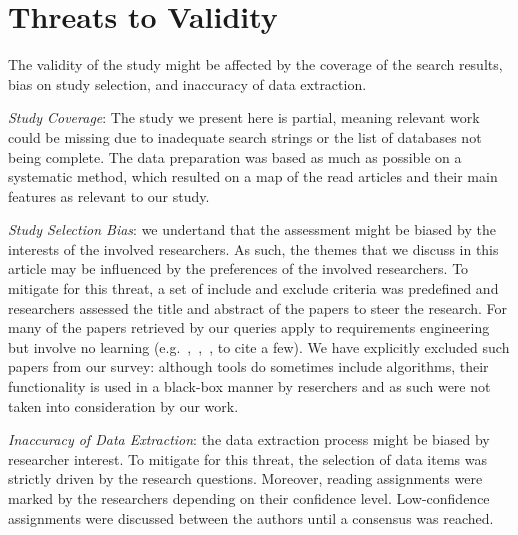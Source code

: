 \section{Threats to Validity}
\label{sec:threats_to_validity}

The validity of the study might be affected by the coverage of the search
results, bias on study selection, and inaccuracy of data extraction.

\emph{Study Coverage}: The study we present here is partial, meaning
relevant work could be missing due to inadequate search strings or
the list of databases not being complete. The data preparation was based as
much as possible on a systematic method, which resulted on a map of the read
articles and their main features as relevant to our study.

\emph{Study Selection Bias}: we undertand that the assessment might be biased by
the interests of the involved researchers. As such, the themes that we discuss
in this article may be influenced by the preferences of the involved
researchers. To mitigate for this threat, a set of include and exclude criteria
was predefined and researchers assessed the title and abstract of the papers to
steer the research. For many of the papers retrieved by our queries apply \NLP
to requirements engineering but involve no learning
(e.g.~\cite{Xiao:2012},~\cite{Deeptimahanti:2011},~\cite{ChengHeLiangLi:2010},
to cite a few). We have explicitly excluded such papers from our survey:
although \NLP tools do sometimes include \ML algorithms, their functionality is
used in a black-box manner by \RE reserchers and as such were not taken into
consideration by our work.

\emph{Inaccuracy of Data Extraction}: the data extraction process might be
biased by researcher interest. To mitigate for this threat, the selection of
data items was strictly driven by the research questions. Moreover,
reading assignments were marked by the researchers depending on their confidence
level. Low-confidence assignments were discussed between the authors until a consensus was reached.